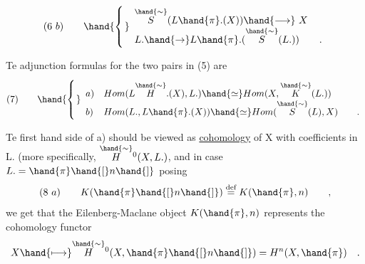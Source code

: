 \[
(6\ b)\qquad \hand{\left\{\rule{0pt}{2.5em}\right.}\begin{array}{l}
\overset{\hand{\sim}}{S}(L\hand{\pi}.(X)) \hand{\longrightarrow} \ X \\
L. \hand{\to} L\hand{\pi}.(\overset{\hand{\sim}}{S}(L.)) \qquad .
\end{array}
\]

Te adjunction formulas for the two pairs in (5) are
\[
(7)\qquad \hand{\left\{\rule{0pt}{2.5em}\right.}\begin{array}{ll}
a) & Hom(L\overset{\hand{\sim}}{H}.(X),L.) \hand{\simeq} Hom(X, \overset{\hand{\sim}}{K}(L.)) \\
b) & Hom(L., L\hand{\pi}.(X)) \hand{\simeq} Hom(\overset{\hand{\sim}}{S}(L),X) \qquad .
\end{array}
\]

Te first hand side of a) should be viewed as \uline{cohomology} of X with
coefficients in L. (more specifically,  $\overset{\hand{\sim}}{H}{}^{0}(X, L.)$, and in case $L. =\hand{\pi}\hand{[}n\hand{]}$\hand{,}
 posing
\[
(8\ a)\qquad K(\hand{\pi}\hand{[}n\hand{]}) \overset{\text{def}}{=} K(\hand{\pi},n) \qquad ,
\]
we get that the Eilenberg-Maclane object $K(\hand{\pi},n)$ represents the cohomology
functor
\[
X \hand{\longmapsto} \overset{\hand{\sim}}{H}{}^{0}(X,\hand{\pi}\hand{[}n\hand{]}) = H^{n}(X,\hand{\pi}) \quad .
\]

